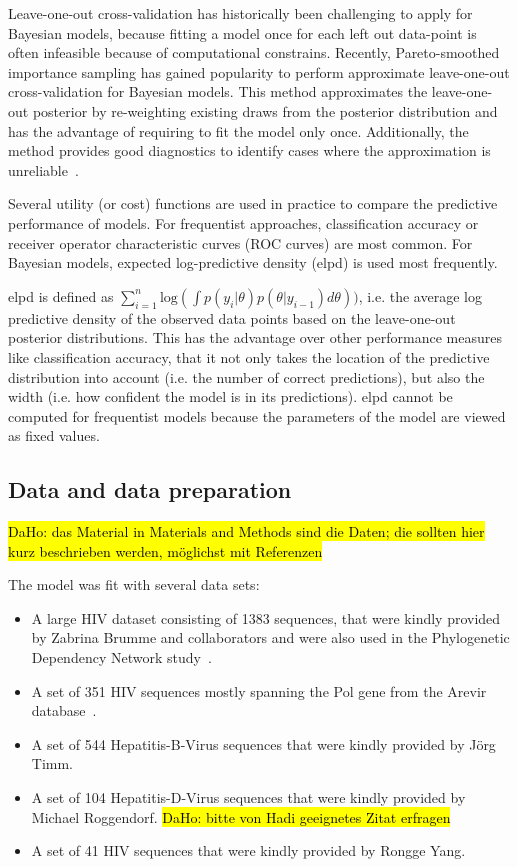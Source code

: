 \documentclass{bioinfo}
\begin{document}
\begin{methods}
  Leave-one-out cross-validation has historically been challenging to apply for Bayesian models, because fitting a model once for each left out data-point is often infeasible because of computational constrains.
  Recently, Pareto-smoothed importance sampling has gained popularity to perform approximate leave-one-out cross-validation for Bayesian models. This method  approximates the leave-one-out posterior by re-weighting existing draws from the posterior distribution and has the advantage of requiring to fit the model only once. Additionally, the method provides good diagnostics to identify cases where the approximation is unreliable~\cite{Vehtari2016}.

  Several utility (or cost) functions are used in practice to compare the predictive performance of models. For frequentist approaches, classification accuracy or receiver operator characteristic curves (ROC curves) are most common.
  For Bayesian models, expected log-predictive density (elpd) is used most frequently. 

  elpd is defined as \(\sum_{i=1}^{n}\text{log}(\int p(y_i|\theta)p(\theta|y_{i-1})d\theta))\), i.e. the average log predictive density of the observed data points based on the leave-one-out posterior distributions.
  This has the advantage over other performance measures like classification accuracy, that it not only takes the location of the predictive distribution into account (i.e. the number of correct predictions), but also the width (i.e. how confident the model is in its predictions).
  elpd cannot be computed for frequentist models because the parameters of the model are viewed as fixed values.

  \subsection{Data and data preparation}
 \hl{DaHo: das Material in Materials and Methods sind die Daten; die sollten hier kurz beschrieben werden, möglichst mit Referenzen}

The model was fit with several data sets:

\begin{itemize}
  \item A large HIV dataset consisting of 1383 sequences, that were kindly provided by Zabrina Brumme and collaborators and were also used in the Phylogenetic Dependency Network study~\citep{Carlson2008}.
  \item A set of 351 HIV sequences mostly spanning the Pol gene from the Arevir database~\citep{Roomp2006}.
  \item A set of 544 Hepatitis-B-Virus sequences that were kindly provided by Jörg Timm.
  \item A set of 104 Hepatitis-D-Virus sequences that were kindly provided by Michael Roggendorf. \hl{DaHo: bitte von Hadi geeignetes Zitat erfragen}
  \item A set of 41 HIV sequences that were kindly provided by Rongge Yang. 
\end{itemize}


\end{methods}
\end{document}
